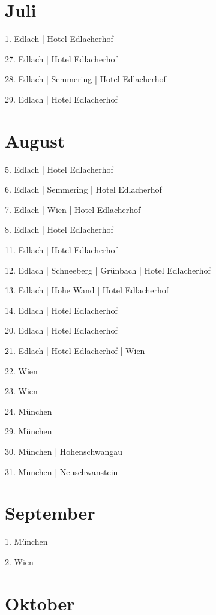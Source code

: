 \documentclass[twoside=false,titlepage=false,open=any, parskip=never, fontsize=10pt, headings=small, chapterprefix=false, appendixprefix=false, DIV=15]{scrbook}
\begin{document}
\begin{multicols}{3}
            \section*{Juli}
            1. Edlach | Hotel Edlacherhof\par
            27. Edlach | Hotel Edlacherhof\par
            28. Edlach | Semmering | Hotel Edlacherhof\par
            29. Edlach | Hotel Edlacherhof\par
            \section*{August}
            5. Edlach | Hotel Edlacherhof\par
            6. Edlach | Semmering | Hotel Edlacherhof\par
            7. Edlach | Wien | Hotel Edlacherhof\par
            8. Edlach | Hotel Edlacherhof\par
            11. Edlach | Hotel Edlacherhof\par
            12. Edlach | Schneeberg | Grünbach | Hotel Edlacherhof\par
            13. Edlach | Hohe Wand | Hotel Edlacherhof\par
            14. Edlach | Hotel Edlacherhof\par
            20. Edlach | Hotel Edlacherhof\par
            21. Edlach | Hotel Edlacherhof | Wien\par
            22. Wien\par
            23. Wien\par
            24. München\par
            29. München\par
            30. München | Hohenschwangau\par
            31. München | Neuschwanstein\par
            \section*{September}
            1. München\par
            2. Wien\par
            \section*{Oktober}

\end{multicols}
\end{document}
